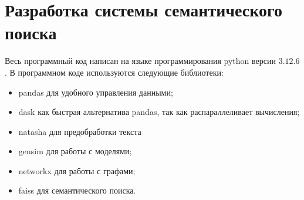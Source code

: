 \documentclass[coursework]{SCWorks}
\begin{document}

    
    



\section{Разработка системы семантического поиска}
Весь программный код написан на языке программирования python версии $3.12.6$. В программном коде используются следующие библиотеки:
\begin{itemize}
  \item pandas для удобного управления данными;
  \item dask как быстрая альтернатива pandas, так как распараллеливает вычисления;
  \item natasha для предобработки текста
  \item gensim для работы с моделями;
  \item networkx для работы с графами;
  \item faiss для семантического поиска.
\end{itemize}
\end{document}
